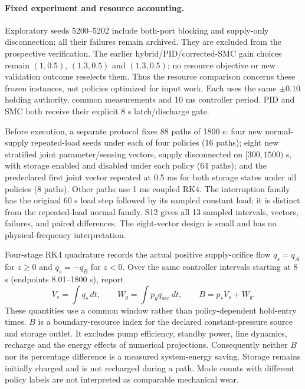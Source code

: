 \paragraph{Fixed experiment and resource accounting.}
Exploratory seeds 5200--5202 include both-port blocking and supply-only disconnection; all their failures remain archived. They are excluded from the prospective verification. The earlier hybrid/PID/corrected-SMC gain choices remain $(1,0.5)$, $(1.3,0.5)$ and $(1.3,0.5)$; no resource objective or new validation outcome reselects them. Thus the resource comparison concerns these frozen instances, not policies optimized for input work. Each uses the same $\pm0.10$ holding authority, common measurements and 10 ms controller period. PID and SMC both receive their explicit 8 s latch/discharge gate.

Before execution, a separate protocol fixes 88 paths of 1800 s: four new normal-supply repeated-load seeds under each of four policies (16 paths); eight new stratified joint parameter/sensing vectors, supply disconnected on $[300,1500)$ s, with storage enabled and disabled under each policy (64 paths); and the predeclared first joint vector repeated at 0.5 ms for both storage states under all policies (8 paths). Other paths use 1 ms coupled RK4. The interruption family has the original 60 s load step followed by its sampled constant load; it is distinct from the repeated-load normal family. S12 gives all 13 sampled intervals, vectors, failures, and paired differences. The eight-vector design is small and has no physical-frequency interpretation.

Four-stage RK4 quadrature records the actual positive supply-orifice flow $q_s=q_A$ for $z\ge0$ and $q_s=-q_B$ for $z<0$. Over the same controller intervals starting at 8 s (endpoints 8.01--1800 s), report
\begin{equation}
 V_s=\int q_s\,dt,\qquad
 W_g=\int p_gq_{acc}\,dt,\qquad
 B=p_sV_s+W_g.\label{eq:boundary-resource}
\end{equation}
These quantities use a common window rather than policy-dependent hold-entry times. $B$ is a boundary-resource index for the declared constant-pressure source and storage outlet. It excludes pump efficiency, standby power, line dynamics, recharge and the energy effects of numerical projections. Consequently neither $B$ nor its percentage difference is a measured system-energy saving. Storage remains initially charged and is not recharged during a path. Mode counts with different policy labels are not interpreted as comparable mechanical wear.
